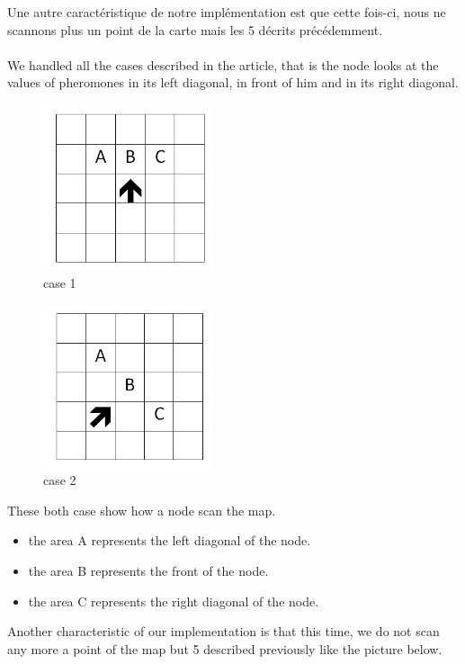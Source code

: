 Une autre caractéristique de notre implémentation est que cette fois-ci, nous ne scannons plus un point de la carte mais les 5 décrits précédemment.\\\\

We handled all the cases described in the article, that is the node looks at the values of pheromones in its left diagonal, in front of him and in its right diagonal.

\begin{figure}[h]
\center
\includegraphics[width=5cm]{../images/grille_case_1.png}
\caption{case 1}
\end{figure}

\begin{figure}[h]
\center
\includegraphics[width=5cm]{../images/grille_case_2.png}
\caption{case 2}
\end{figure}

These both case show how a node scan the map.
\begin{itemize}
\item the area A represents the left diagonal of the node.
\item the area B represents the front of the node.
\item the area C represents the right diagonal of the node.
\end{itemize}

Another characteristic of our implementation is that this time, we do not scan any more a point of the map but 5 described previously  like the picture below.

